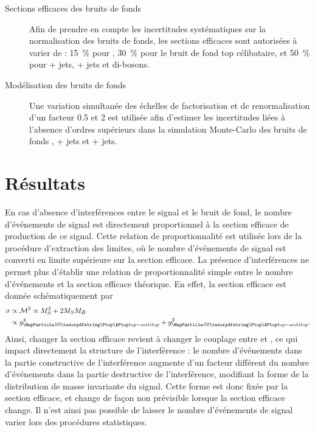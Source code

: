 \begin{description}
  \item[Sections efficaces des bruits de fonds] Afin de prendre en compte les incertitudes systématiques sur la normalisation des bruits de fonds, les sections efficaces sont autorisées à varier de : \SI{15}{\percent} pour \ttbar, \SI{30}{\percent} pour le bruit de fond top célibataire, et \SI{50}{\percent} pour \PW + jets, \PZ + jets et di-bosons.
  \item[Modélisation des bruits de fonds] Une variation simultanée des échelles de factorisation et de renormalisation d'un facteur \num{0.5} et \num{2} est utilisée afin d'estimer les incertitudes liées à l'absence d'ordres supérieurs dans la simulation Monte-Carlo des bruits de fonds \ttbar, \PW + jets et \PZ + jets.
\end{description}

\section{Résultats}

En cas d'absence d'interférences entre le signal et le bruit de fond, le nombre d'événements de signal est directement proportionnel à la section efficace de production de ce signal. Cette relation de proportionnalité est utilisée lors de la procédure d'extraction des limites, où le nombre d'événements de signal est converti en limite supérieure sur la section efficace.
La présence d'interférences ne permet plus d'établir une relation de proportionnalité simple entre le nombre d'événements et la section efficace théorique. En effet, la section efficace est donnée schématiquement par
\begin{align*}
  \sigma &\propto \mathcal{M}^2 \propto M_{S}^2 + 2 M_{S}M_{B} \\
         &\propto g_{\sz\ttbar}^4 + g_{\sz\ttbar}^2.
\end{align*}
Ainsi, changer la section efficace revient à changer le couplage entre \sz et \ttbar, ce qui impact directement la structure de l'interférence : le nombre d'événements dans la partie constructive de l'interférence augmente d'un facteur différent du nombre d'événements dans la partie destructive de l'interférence, modifiant la forme de la distribution de masse invariante du signal. Cette forme est donc fixée par la section efficace, et change de façon non prévisible lorsque la section efficace change. Il n'est ainsi pas possible de laisser le nombre d'événements de signal varier lors des procédures statistiques.


